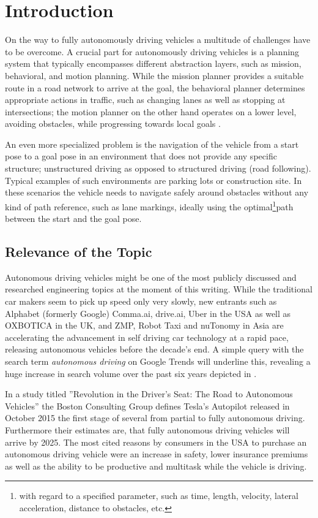 \chapter{Introduction}
On the way to fully autonomously driving vehicles a multitude of challenges have to be overcome. A crucial part for autonomously driving vehicles is a planning system that typically encompasses different abstraction layers, such as mission, behavioral, and motion planning. While the mission planner provides a suitable route in a road network to arrive at the goal, the behavioral planner determines appropriate actions in traffic, such as changing lanes as well as stopping at intersections; the motion planner on the other hand operates on a lower level, avoiding obstacles, while progressing towards local goals \cite{Urmson.2008}.

An even more specialized problem is the navigation of the vehicle from a start pose to a goal pose in an environment that does not provide any specific structure; unstructured driving as opposed to structured driving (road following). Typical examples of such environments are parking lots or construction site. In these scenarios the vehicle needs to navigate safely around obstacles without any kind of path reference, such as lane markings, ideally using the optimal\footnote{with regard to a specified parameter, such as time, length, velocity, lateral acceleration, distance to obstacles, etc.}path between the start and the goal pose.

\section{Relevance of the Topic}
Autonomous driving vehicles might be one of the most publicly discussed and researched engineering topics at the moment of this writing. While the traditional car makers seem to pick up speed only very slowly, new entrants such as Alphabet (formerly Google) Comma.ai, drive.ai, Uber in the USA as well as OXBOTICA in the UK, and ZMP, Robot Taxi and nuTonomy in Asia are accelerating the advancement in self driving car technology at a rapid pace, releasing autonomous vehicles before the decade's end. A simple query with the search term \emph{autonomous driving} on Google Trends will underline this, revealing a huge increase in search volume over the past six years depicted in .

In a study titled ''Revolution in the Driver's Seat: The Road to Autonomous Vehicles'' the Boston Consulting Group defines Tesla's Autopilot released in October 2015 the first stage of several from partial to fully autonomous driving. Furthermore their estimates are, that fully autonomous driving vehicles will arrive by 2025. The most cited reasons by consumers in the USA to purchase an autonomous driving vehicle were an increase in safety, lower insurance premiums as well as the ability to be productive and multitask while the vehicle is driving. \cite{Mosquet.2015} 

